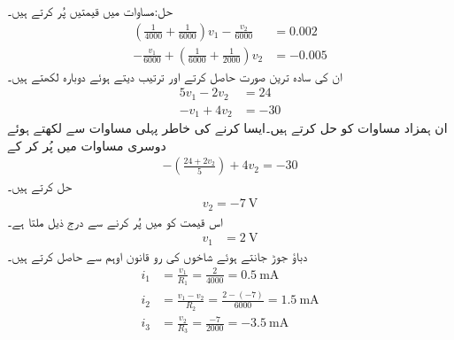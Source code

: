 حل:مساوات  میں قیمتیں پُر کرتے ہیں۔
\begin{align*}
\left( \frac{1}{4000}+\frac{1}{6000}\right) v_1 - \frac{v_2}{6000}&=0.002\\
-\frac{v_1}{6000}+\left(\frac{1}{6000}+\frac{1}{2000}\right)v_2&=-0.005
\end{align*}
ان کی سادہ ترین صورت حاصل کرتے اور ترتیب دیتے ہوئے دوبارہ لکھتے ہیں۔
\begin{align*}
5v_1-2v_2&=24\\
-v_1+4v_2&=-30
\end{align*}
ان ہمزاد مساوات کو حل کرتے ہیں۔ایسا کرنے کی خاطر پہلی مساوات سے   لکھتے ہوئے دوسری مساوات میں پُر کر کے
\begin{align*}
-\left(\frac{24+2v_2}{5}\right)+4v_2=-30
\end{align*}
حل کرتے ہیں۔
\begin{align*}
v_2=\SI{-7}{\volt}
\end{align*} 
اس قیمت کو  میں پُر کرنے سے درج ذیل ملتا ہے۔
\begin{align*}
v_1&=\SI{2}{\volt}
\end{align*}
دباؤ جوڑ جانتے ہوئے شاخوں کی رو قانون اوہم سے حاصل کرتے ہیں۔
\begin{align*}
i_1&=\frac{v_1}{R_1}=\frac{2}{4000}=\SI{0.5}{\milli\ampere}\\
i_2&=\frac{v_1-v_2}{R_2}=\frac{2-(-7)}{6000}=\SI{1.5}{\milli\ampere}\\
i_3&=\frac{v_2}{R_3}=\frac{-7}{2000}=\SI{-3.5}{\milli\ampere}
\end{align*}


